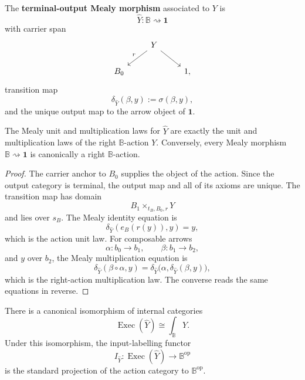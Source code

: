 \begin{definition}
\label{def:relative-terminal-output-mealy-action}
The \textbf{terminal-output Mealy morphism} associated to \(Y\) is
\[
    \widehat Y:\mathbb B\rightsquigarrow\mathbf 1
\]
with carrier span
\[
\begin{tikzcd}
    & Y \arrow[dl,"r"'] \arrow[dr] & \\
    B_0 && 1,
\end{tikzcd}
\]
transition map
\[
    \delta_{\widehat Y}(\beta,y):=\sigma(\beta,y),
\]
and the unique output map to the arrow object of \(\mathbf 1\).
\end{definition}

\begin{proposition}
\label{prop:relative-actions-terminal-output-mealy}
The Mealy unit and multiplication laws for \(\widehat Y\) are exactly the unit
and multiplication laws of the right \(\mathbb B\)-action \(Y\).
Conversely, every Mealy morphism \(\mathbb B\rightsquigarrow\mathbf 1\) is
canonically a right \(\mathbb B\)-action.
\end{proposition}

\begin{proof}
The carrier anchor to \(B_0\) supplies the object of the action.  Since the
output category is terminal, the output map and all of its axioms are unique.
The transition map has domain
\[
    B_1\times_{t_B,B_0,r}Y
\]
and lies over \(s_B\).  The Mealy identity equation is
\[
    \delta_{\widehat Y}(e_B(r(y)),y)=y,
\]
which is the action unit law.  For composable arrows
\[
    \alpha:b_0\to b_1,
    \qquad
    \beta:b_1\to b_2,
\]
and \(y\) over \(b_2\), the Mealy multiplication equation is
\[
    \delta_{\widehat Y}(\beta\circ\alpha,y)
    =
    \delta_{\widehat Y}
    \bigl(\alpha,\delta_{\widehat Y}(\beta,y)\bigr),
\]
which is the right-action multiplication law.  The converse reads the same
equations in reverse.
\end{proof}

\begin{proposition}
\label{prop:relative-exec-terminal-output-action}
There is a canonical isomorphism of internal categories
\[
    \operatorname{Exec}(\widehat Y)
    \cong
    \int_{\mathbb B}Y.
\]
Under this isomorphism, the input-labelling functor
\[
    I_{\widehat Y}:\operatorname{Exec}(\widehat Y)
    \to\mathbb B^{\mathrm{op}}
\]
is the standard projection of the action category to
\(\mathbb B^{\mathrm{op}}\).
\end{proposition}

